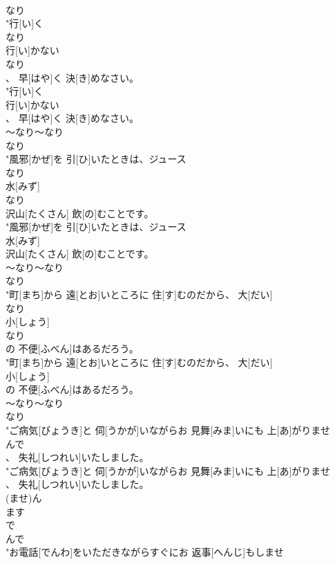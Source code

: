 \documentclass[8pt]{extreport}
\begin{document}
\begin{CJK}{UTF8}{min}
\\	なり
\\	"行[い]く
\\	なり
\\	行[い]かない
\\	なり
\\	、 早[はや]く 決[き]めなさい。
\\	"行[い]く
\\	行[い]かない
\\	、 早[はや]く 決[き]めなさい。
\\	～なり～なり	
\\	なり
\\	"風邪[かぜ]を 引[ひ]いたときは、ジュース
\\	なり
\\	水[みず]
\\	なり
\\	沢山[たくさん] 飲[の]むことです。
\\	"風邪[かぜ]を 引[ひ]いたときは、ジュース
\\	水[みず]
\\	沢山[たくさん] 飲[の]むことです。
\\	～なり～なり	
\\	なり
\\	"町[まち]から 遠[とお]いところに 住[す]むのだから、 大[だい]
\\	なり
\\	小[しょう]
\\	なり
\\	の 不便[ふべん]はあるだろう。
\\	"町[まち]から 遠[とお]いところに 住[す]むのだから、 大[だい]
\\	小[しょう]
\\	の 不便[ふべん]はあるだろう。
\\	～なり～なり	
\\	なり
\\	"ご病気[びょうき]と 伺[うかが]いながらお 見舞[みま]いにも 上[あ]がりませ
\\	んで
\\	、 失礼[しつれい]いたしました。
\\	"ご病気[びょうき]と 伺[うかが]いながらお 見舞[みま]いにも 上[あ]がりませ
\\	、 失礼[しつれい]いたしました。
\\	(ませ)ん 
\\	ます 
\\	で	
\\	んで
\\	"お電話[でんわ]をいただきながらすぐにお 返事[へんじ]もしませ

\end{CJK}
\end{document}
